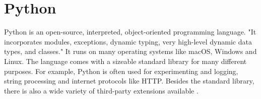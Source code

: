 \section{Python}
Python is an open-source, interpreted, object-oriented programming language. "It incorporates modules, exceptions, dynamic typing, very high-level dynamic data types, and classes." It runs on many operating systems like macOS, Windows and Linux.
The language comes with a sizeable standard library for many different purposes. For example, Python is often used for experimenting and logging, string processing and internet protocols like HTTP. Besides the standard library, there is also a wide variety of third-party extensions available \cite{python}.
